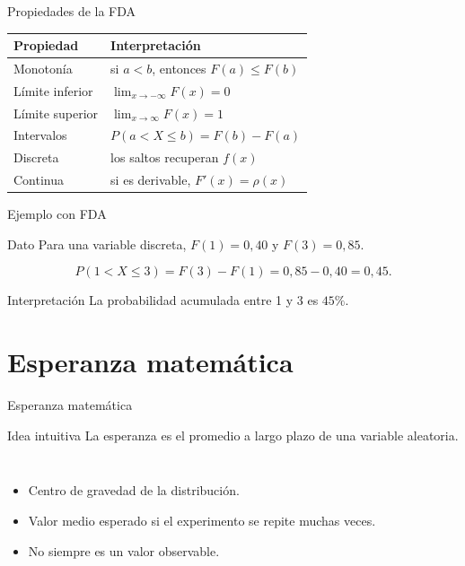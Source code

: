 \documentclass[aspectratio=169,11pt]{beamer}
\begin{document}
\begin{frame}{Propiedades de la FDA}
\small
\begin{tabular}{p{}p{}}
\toprule
Propiedad & Interpretación \\
\midrule
Monotonía & si $a<b$, entonces $F(a)\le F(b)$ \\
Límite inferior & $\lim_{x\to-\infty}F(x)=0$ \\
Límite superior & $\lim_{x\to\infty}F(x)=1$ \\
Intervalos & $P(a<X\le b)=F(b)-F(a)$ \\
Discreta & los saltos recuperan $f(x)$ \\
Continua & si es derivable, $F'(x)=\rho(x)$ \\
\bottomrule
\end{tabular}
\end{frame}

\begin{frame}{Ejemplo con FDA}
\begin{block}{Dato}
Para una variable discreta, $F(1)=0{,}40$ y $F(3)=0{,}85$.
\end{block}
\pause
\[
P(1<X\le3)=F(3)-F(1)=0{,}85-0{,}40=0{,}45.
\]
\begin{exampleblock}{Interpretación}
La probabilidad acumulada entre 1 y 3 es $45\%$.
\end{exampleblock}
\end{frame}

\section{Esperanza matemática}

\begin{frame}{Esperanza matemática}
\begin{block}{Idea intuitiva}
La esperanza es el promedio a largo plazo de una variable aleatoria.
\end{block}
\begin{columns}[T]
\begin{itemize}
  \item Centro de gravedad de la distribución.
  \item Valor medio esperado si el experimento se repite muchas veces.
  \item No siempre es un valor observable.
\end{itemize}
\end{columns}
\end{frame}
\end{document}
